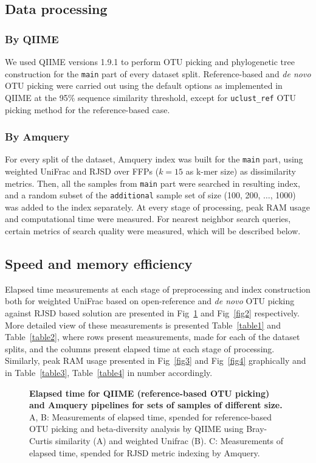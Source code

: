 \documentclass[10pt,letterpaper]{article}
\begin{document}
\subsection*{Data processing}

\subsubsection*{By QIIME}
We used QIIME versions 1.9.1 to perform OTU picking and phylogenetic tree construction for the \texttt{main} part of every dataset split.
Reference-based and \textit{de novo} OTU picking were carried out using the default options as implemented in QIIME at the 95\% sequence similarity threshold, 
except for \texttt{uclust\_ref} OTU picking method for the reference-based case.

\subsubsection*{By Amquery}
For every split of the dataset, Amquery index was built for the \texttt{main} part, using weighted UniFrac and RJSD over FFPs ($k=15$ as k-mer size) as dissimilarity metrics.
Then, all the samples from \texttt{main} part were searched in resulting index, and a random subset of the \texttt{additional} sample set of size (100, 200, $\dots$, 1000) was added to the index separately. 
At every stage of processing, peak RAM usage and computational time were measured. For nearest neighbor search queries, certain metrics of search quality were measured, which will be described below. 

\subsection*{Speed and memory efficiency}
Elapsed time measurements at each stage of preprocessing and index construction 
both for weighted UniFrac based on open-reference and \textit{de novo} OTU picking against RJSD based solution 
are presented in Fig~\ref{fig1} and Fig~\ref{fig2} respectively.
More detailed view of these measurements is presented Table~\ref{table1} and Table~\ref{table2},
where rows present measurements, made for each of the dataset splits, and the columns present elapsed time at each stage of processing. 
Similarly, peak RAM usage presented in Fig~\ref{fig3} and Fig~\ref{fig4} graphically and in Table~\ref{table3}, Table~\ref{table4} in number accordingly.


\begin{figure}[!h]
\caption{{\bf Elapsed time for QIIME (reference-based OTU picking) and Amquery pipelines for sets of samples of different size.}
A, B: Measurements of elapsed time, spended for reference-based OTU picking and beta-diversity analysis by QIIME using Bray-Curtis similarity (A) and weighted Unifrac (B). 
C: Measurements of elapsed time, spended for RJSD metric indexing by Amquery.}
\label{fig1}
\end{figure}
\end{document}
